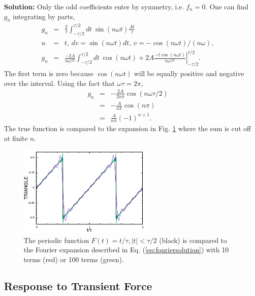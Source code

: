 {\bf Solution:} Only the odd coefficients enter by symmetry, i.e. $f_n=0$. One can find $g_n$ integrating by parts,
\begin{eqnarray}
\label{eq:fouriersolution}
g_n&=&\frac{2}{\tau}\int_{-\tau/2}^{\tau/2}dt~\sin(n\omega t) \frac{At}{\tau}\\
\nonumber
u&=&t,~dv=\sin(n\omega t)dt,~v=-\cos(n\omega t)/(n\omega),\\
\nonumber
g_n&=&\frac{-2A}{n\omega \tau^2}\int_{-\tau/2}^{\tau/2}dt~\cos(n\omega t)
+\left.2A\frac{-t\cos(n\omega t)}{n\omega\tau^2}\right|_{-\tau/2}^{\tau/2}.
\end{eqnarray}
The first term is zero because $\cos(n\omega t)$ will be equally positive and negative over the interval. Using the fact that $\omega\tau=2\pi$,
\begin{eqnarray}
g_n&=&-\frac{2A}{2n\pi}\cos(n\omega\tau/2)\\
\nonumber
&=&-\frac{A}{n\pi}\cos(n\pi)\\
\nonumber
&=&\frac{A}{n\pi}(-1)^{n+1}.
\end{eqnarray}
The true function is compared to the expansion in Fig. \ref{fig:triangle} where the sum is cut off at finite $n$.
\begin{figure}
\centerline{\includegraphics[width=0.6\textwidth]{figs/triangle}}
\caption{\label{fig:triangle}
The periodic function $F(t)=t/\tau, |t|<\tau/2$ (black) is compared to the Fourier expansion described in Eq. (\ref{eq:fouriersolution}) with 10 terms (red) or 100 terms (green).}
\end{figure}

\exampleend

\subsection{Response to Transient Force}

